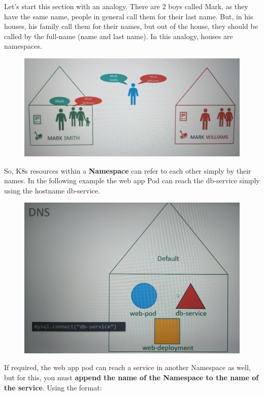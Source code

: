 \documentclass{article}
\begin{document}
Let's start this section with an analogy. There are 2 boys called Mark, as they have the same name, people in general call them for their last name. But, in his houses, his family call them for their names, but out of the house, they should be called by the full-name (name and last name). In this analogy, houses are namespaces.

\begin{figure}[H]
    \centering
    \includegraphics[scale=0.4]{pictures/namespace1.jpeg}
\end{figure}

So, K8s resources within a \textbf{Namespace} can refer to each other simply by their names. In the following example the web app Pod can reach the db-service simply using the hostname db-service. 

\begin{figure}[H]
    \centering
    \includegraphics[scale=0.2]{pictures/namespace2.jpeg}
\end{figure}

If required, the web app pod can reach a service in another Namespace as well, but for this, you must \textbf{append the name of the Namespace to the name of the service}. Using the format:
\end{document}
